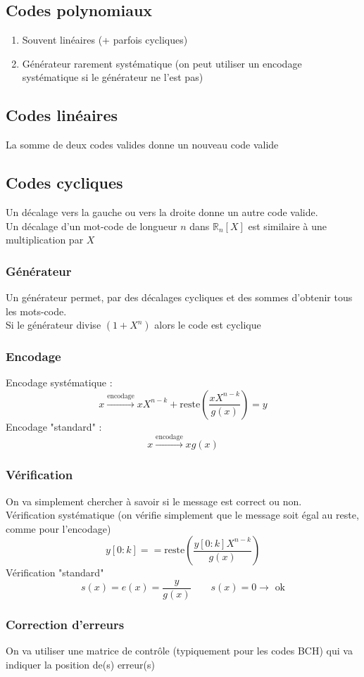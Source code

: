 \documentclass[resume.tex]{subfiles}
\begin{document}
\subsection{Codes polynomiaux}
\begin{enumerate}
\item Souvent linéaires (+ parfois cycliques)
\item Générateur rarement systématique (on peut utiliser un encodage systématique si le générateur ne l'est pas)
\end{enumerate}
\subsection{Codes linéaires}
La somme de deux codes valides donne un nouveau code valide
\subsection{Codes cycliques}
Un décalage vers la gauche ou vers la droite donne un autre code valide.\\
Un décalage d'un mot-code de longueur $n$ dans $\mathbb{R}_n[X]$ est similaire à une multiplication par $X$
\subsubsection{Générateur}
Un générateur permet, par des décalages cycliques et des sommes d'obtenir tous les mots-code.\\
Si le générateur divise $(1+X^n)$ alors le code est cyclique
\subsubsection{Encodage}
Encodage systématique :
$$x\xrightarrow{\text{encodage}} xX^{n-k}+\text{reste}\left(\frac{xX^{n-k}}{g(x)}\right)=y$$
Encodage "standard" :
$$x\xrightarrow{\text{encodage}} xg(x)$$
\subsubsection{Vérification}
On va simplement chercher à savoir si le message est correct ou non.\\
Vérification systématique (on vérifie simplement que le message soit égal au reste, comme pour l'encodage)
$$y[0:k] == \text{reste}\left(\frac{y[0:k]X^{n-k}}{g(x)}\right)$$
Vérification "standard"
$$s(x)=e(x)=\frac{y}{g(x)}\qquad s(x)=0\longrightarrow\text{ ok}$$
\subsubsection{Correction d'erreurs}
On va utiliser une matrice de contrôle (typiquement pour les codes BCH) qui va indiquer la position de(s) erreur(s)
\end{document}
